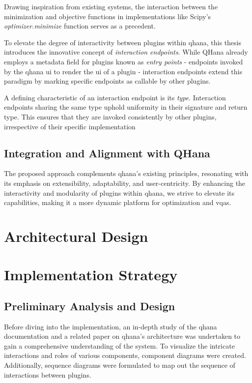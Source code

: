 \documentclass[
  a4paper,  %
  twoside,  %
  bibliography=totoc,
  headsepline,
  cleardoublepage=empty,
  parskip=half,
  draft=false
]{scrbook}
\begin{document}
Drawing inspiration from existing systems, the interaction between the minimization and objective functions in implementations like Scipy's \emph{optimizer.minimize} \cite{2020SciPy-NMeth} function serves as a precedent.

To elevate the degree of interactivity between plugins within \gls{qhana}, this thesis introduces the innovative concept of \emph{interaction endpoints}.
While QHana already employs a metadata field for plugins known as \emph{entry points} - endpoints invoked by the \gls{qhana} \gls{ui} to render the \gls{ui} of a plugin - interaction endpoints extend this paradigm by marking specific endpoints as callable by other plugins.

A defining characteristic of an interaction endpoint is its \emph{type}.
Interaction endpoints sharing the same type uphold uniformity in their signature and return type.
This ensures that they are invoked consistently by other plugins, irrespective of their specific implementation

\subsection{Integration and Alignment with QHana}
The proposed approach complements \gls{qhana}'s existing principles, resonating with its emphasis on extensibility, adaptability, and user-centricity.
By enhancing the interactivity and modularity of plugins within \gls{qhana}, we strive to elevate its capabilities, making it a more dynamic platform for optimization and \glspl{vqa}.

\section{Architectural Design}


\section{Implementation Strategy}
\label{sec:implementationStrategy}

\subsection{Preliminary Analysis and Design}
Before diving into the implementation, an in-depth study of the \gls{qhana} documentation and a related paper on \gls{qhana}'s architecture \cite{Buehler2022} was undertaken to gain a comprehensive understanding of the system.
To visualize the intricate interactions and roles of various components, component diagrams were created.
Additionally, sequence diagrams were formulated to map out the sequence of interactions between plugins.
\end{document}
